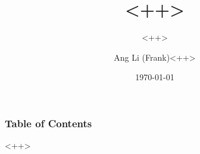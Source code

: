 \documentclass{beamer}
\title{<++>}
\subtitle{<++>}
\author{Ang Li (Frank)<++>}
\institute{Yew Chung International School}
\date{\today}
\begin{document}
\begin{frame}
\frametitle{Table of Contents}
\begingroup
	\renewcommand*{\IgnoreToc}[1]{}
	\tableofcontents
\endgroup
\end{frame}

<++>
\end{document}
